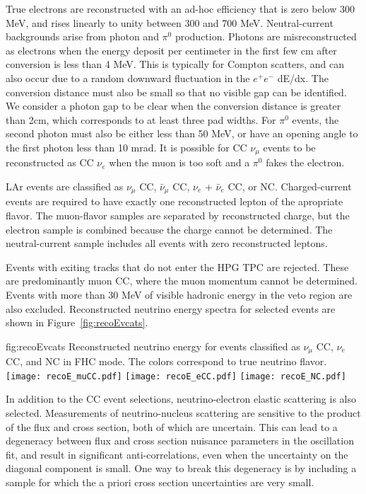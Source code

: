 True electrons are reconstructed with an ad-hoc efficiency that is zero below 300 MeV, and rises linearly to unity between 300 and 700 MeV. Neutral-current backgrounds arise from photon and $\pi^{0}$ production. Photons are misreconstructed as electrons when the energy deposit per centimeter in the first few cm after conversion is less than 4 MeV. This is typically for Compton scatters, and can also occur due to a random downward fluctuation in the $e^{+}e^{-}$ dE/dx. The conversion distance must also be small so that no visible gap can be identified. We consider a photon gap to be clear when the conversion distance is greater than 2cm, which corresponds to at least three pad widths. For $\pi^{0}$ events, the second photon must also be either less than 50 MeV, or have an opening angle to the first photon less than 10 mrad. It is possible for CC $\nu_{\mu}$ events to be reconstructed as CC $\nu_{e}$ when the muon is too soft and a $\pi^{0}$ fakes the electron.

LAr events are classified as $\nu_{\mu}$ CC, $\bar{\nu}_{\mu}$ CC, $\nu_{e}$ + $\bar{\nu}_{e}$ CC, or NC. Charged-current events are required to have exactly one reconstructed lepton of the apropriate flavor. The muon-flavor samples are separated by reconstructed charge, but the electron sample is combined because the charge cannot be determined. The neutral-current sample includes all events with zero reconstructed leptons.

Events with exiting tracks that do not enter the HPG TPC are rejected. These are predominantly muon CC, where the muon momentum cannot be determined. Events with more than 30 MeV of visible hadronic energy in the veto region are also excluded. Reconstructed neutrino energy spectra for selected events are shown in Figure~\ref{fig:recoEvcats}.

\begin{dunefigure}{fig:recoEvcats}
{Reconstructed neutrino energy for events classified as $\nu_{\mu}$ CC, $\nu_{e}$ CC, and NC in FHC mode. The colors correspond to true neutrino flavor.}
 \texttt{[image: recoE\_muCC.pdf]}
 \texttt{[image: recoE\_eCC.pdf]}
 \texttt{[image: recoE\_NC.pdf]}
\end{dunefigure}

In addition to the CC event selections, neutrino-electron elastic scattering is also selected. Measurements of neutrino-nucleus scattering are sensitive to the product of the flux and cross section, both of which are uncertain. This can lead to a degeneracy between flux and cross section nuisance parameters in the oscillation fit, and result in significant anti-correlations, even when the uncertainty on the diagonal component is small. One way to break this degeneracy is by including a sample for which the a priori cross section uncertainties are very small. 

